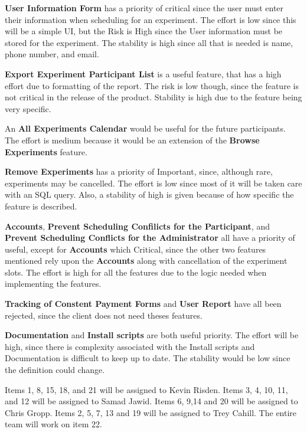\textbf{User Information Form} has a priority of critical since the user must enter their information when scheduling for an experiment.  The effort is low since this will be a simple UI, but the Risk is High since the User information must be stored for the experiment.  The stability is high since all that is needed is name, phone number, and email.  

\textbf{Export Experiment Participant List} is a useful feature, that has a high effort due to formatting of the report.  The risk is low though, since the feature is not critical in the release of the product.  Stability is high due to the feature being very specific.

An \textbf{All Experiments Calendar} would be useful for the future participants.  The effort is medium because it would be an extension of the \textbf{Browse Experiments} feature.

\textbf{Remove Experiments} has a priority of Important, since, although rare, experiments may be cancelled. The effort is low since most of it will be taken care with an SQL query.  Also, a stability of high is given because of  how specific the feature is described.

\textbf{Accounts}, \textbf{Prevent Scheduling Confilicts for the Participant}, and \textbf{Prevent Scheduling Conflicts for the Administrator} all have a priority of useful, except for \textbf{Accounts} which Critical, since the other two features mentioned rely upon the \textbf{Accounts} along with cancellation of the experiment slots.  The effort is high for all the features due to the logic needed when implementing the features.  

\textbf{Tracking of Constent Payment Forms} and \textbf{User Report} have all been rejected, since the client does not need theses features.

\textbf{Documentation} and \textbf{Install scripts} are both useful priority.  The effort will be high, since there is complexity associated with the Install scripts and Documentation is difficult to keep up to date.  The stability would be low since the definition could change.

Items 1, 8, 15, 18, and 21 will be assigned to Kevin Risden.  Items 3, 4, 10, 11, and 12 will be assigned to Samad Jawid.  Items 6, 9,14 and 20  will be assigned to Chris Gropp.  Items 2, 5, 7, 13 and 19 will be assigned to Trey Cahill.  The entire team will work on item 22.
